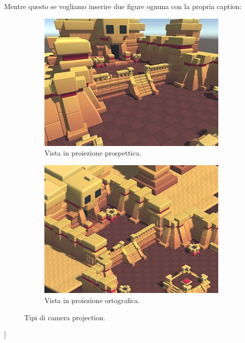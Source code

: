 Mentre questo se vogliamo inserire due figure ognuna con la propria caption:

\begin{figure}[!b]
    \begin{subfigure}{.49\textwidth}
      \centering
      \includegraphics[width=.95\linewidth]{gfx/imgs/introduction/perspective_camera.jpg}
      \caption{Vista in proiezione prospettica.}
      \label{fig:perspective-camera}
    \end{subfigure}
    \begin{subfigure}{.49\textwidth}
      \centering
      \includegraphics[width=.95\linewidth]{gfx/imgs/introduction/ortho_camera.jpg}
      \caption{Vista in proiezione ortografica.}
      \label{fig:ortho-camera}
    \end{subfigure}
    \caption{Tipi di camera projection.}
    \label{fig:camera-projection}
\end{figure}]


